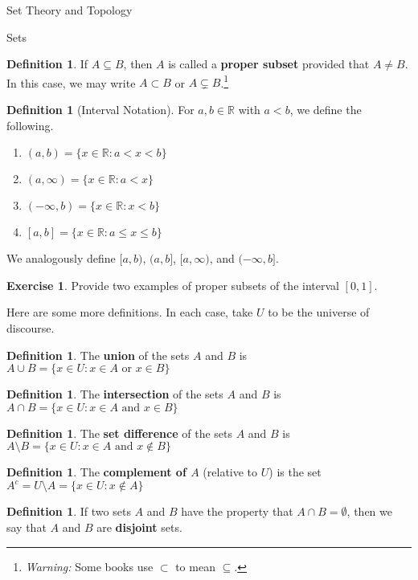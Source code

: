 \documentclass[11pt]{article}
\theoremstyle{definition}
\newtheorem{definition}[theorem]{Definition}
\newtheorem{exercise}[theorem]{Exercise}
\begin{document}
\begin{section}{Set Theory and Topology}
\begin{subsection}{Sets}
\begin{definition}
If $A\subseteq B$, then $A$ is called a \textbf{proper subset} provided that $A\neq B$.  In this case, we may write $A\subset B$ or $A\subsetneq B$.\footnote{\emph{Warning:} Some books use $\subset$ to mean $\subseteq$.}
\end{definition}

\begin{definition}[Interval Notation]
For $a,b\in\mathbb{R}$ with $a<b$, we define the following.
\begin{enumerate}
\item $(a,b)=\{x\in\mathbb{R}:a<x<b\}$
\item $(a,\infty)=\{x\in\mathbb{R}:a<x\}$
\item $(-\infty,b)=\{x\in\mathbb{R}:x<b\}$
\item $[a,b]=\{x\in\mathbb{R}:a\leq x\leq b\}$
\end{enumerate}
We analogously define $[a,b)$, $(a,b]$, $[a,\infty)$, and $(-\infty,b]$.
\end{definition}

\begin{exercise}
Provide two examples of proper subsets of the interval $[0,1]$.
\end{exercise}

Here are some more definitions.  In each case, take $U$ to be the universe of discourse.

\begin{definition}
The \textbf{union} of the sets $A$ and $B$ is $A \cup B =\{x\in U : x\in A \mbox{ or } x\in B \}$
\end{definition}

\begin{definition}
The \textbf{intersection} of the sets $A$ and $B$ is $A \cap B =\{x\in U : x\in A \mbox{ and } x\in B \}$
\end{definition}

\begin{definition}
The \textbf{set difference} of the sets $A$ and $B$ is $A \setminus B =\{x\in U : x\in A \mbox{ and } x\notin B \}$
\end{definition}

\begin{definition}
The \textbf{complement of $A$} (relative to $U$) is the set $A^c=U \setminus A =\{x \in U : x \notin A\}$
\end{definition}

\begin{definition}
If two sets $A$ and $B$ have the property that $A \cap B = \emptyset$, then we say that $A$ and $B$ are \textbf{disjoint} sets.
\end{definition}


\end{subsection}
\end{section}
\end{document}
